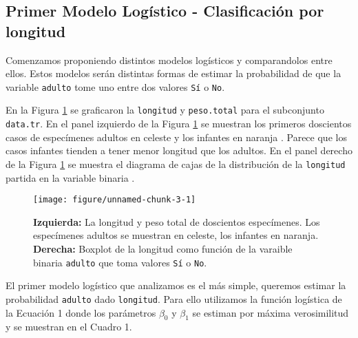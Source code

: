 \documentclass[a4paper]{article}\usepackage[]{graphicx}\usepackage[]{color}
\makeatletter
\def\maxwidth{ %
  \ifdim\Gin@nat@width>\linewidth
    \linewidth
  \else
    \Gin@nat@width
  \fi
}
\newenvironment{knitrout}{}{} %
\makeatother
\begin{document}
\subsection{Primer Modelo Logístico - Clasificación por longitud}

Comenzamos proponiendo distintos modelos logísticos y comparandolos entre ellos. Estos modelos serán distintas formas de estimar la probabilidad de que la variable \texttt{\textcolor{BurntOrange}{adulto}} tome uno entre dos valores \texttt{\textcolor{BurntOrange}{Sí}} o \texttt{\textcolor{BurntOrange}{No}}.

En la Figura \ref{fig:data} se graficaron la \texttt{\textcolor{BurntOrange}{longitud}} y \texttt{\textcolor{BurntOrange}{peso.total}} para el subconjunto \texttt{\textcolor{BurntOrange}{data.tr}}. En el panel izquierdo de la Figura \ref{fig:data} se muestran los primeros doscientos casos de especímenes adultos en celeste y los infantes en naranja . Parece que los casos infantes tienden a tener menor longitud que los adultos. En el panel derecho de la Figura \ref{fig:data} se muestra el diagrama de cajas de la distribución de la \texttt{\textcolor{BurntOrange}{longitud}} partida en la variable binaria \textttt{\textcolor{BurntOrange}{adulto}}.






\begin{figure}[!b]
\caption{\textbf{Izquierda:} La longitud y peso total de doscientos especímenes. Los especímenes adultos se muestran en celeste, los infantes en naranja. \textbf{Derecha:} Boxplot de la longitud como función de la varaible binaria \texttt{\textcolor{BurntOrange}{adulto}} que toma valores \texttt{\textcolor{BurntOrange}{Sí}} o \texttt{\textcolor{BurntOrange}{No}}.}
\label{fig:data}
\begin{knitrout}
\color{fgcolor}

{\centering \texttt{[image: figure/unnamed-chunk-3-1]} 

}



\end{knitrout}
\end{figure}


El primer modelo logístico que analizamos es el más simple, queremos estimar la probabilidad \texttt{\textcolor{BurntOrange}{adulto}} dado \texttt{\textcolor{BurntOrange}{longitud}}. Para ello utilizamos la función logística de la Ecuación 1 donde los parámetros $\beta_0$ y $\beta_1$ se estiman por máxima verosimilitud y se muestran en el Cuadro 1.
\end{document}

